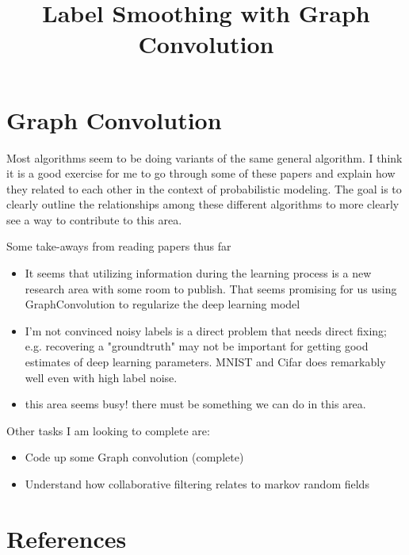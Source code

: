 \documentclass[11pt]{article}
\title{Label Smoothing with Graph Convolution}
\author{}
\date{}
\begin{document}
\maketitle

\section{Graph Convolution}

Most algorithms seem to be doing variants of the same general algorithm. I think it is a good exercise for me to go through some of these papers and explain how they related to each other in the context of probabilistic modeling. The goal is to clearly outline the relationships among these different algorithms to more clearly see a way to contribute to this area.

% 

\vspace{2cm}
\noindent Some take-aways from reading papers thus far
\begin{itemize}
\item It seems that utilizing information during the learning process is a new research area with some room to publish. That seems promising for us using GraphConvolution to regularize the deep learning model
\item I'm not convinced noisy labels is a direct problem that needs direct fixing; e.g. recovering a "groundtruth" may not be important for getting good estimates of deep learning parameters. MNIST and Cifar does remarkably well even with high label noise.
\item this area seems busy! there must be something we can do in this area.
\end{itemize}

\vspace{2cm}
\noindent Other tasks I am looking to complete are:
\begin{itemize}
\item Code up some Graph convolution (complete)
\item Understand how collaborative filtering relates to markov random fields
\end{itemize}

\newpage

\section{References}
\end{document}
